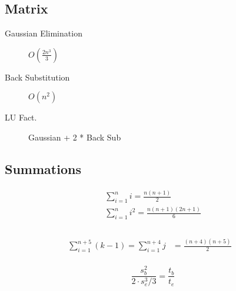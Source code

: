 \documentclass[10pt]{article}
\begin{document}
\begin{multicols}{3}
    \begin{minipage}{\columnwidth}
        \subsection*{Matrix}
        \begin{description}
            \item[Gaussian Elimination] \(O(\frac{2n^3}{3})\)
            \item[Back Substitution] \(O(n^2)\)
            \item[LU Fact.] Gaussian + 2 * Back Sub
        \end{description}
    \end{minipage}

    \begin{minipage}{\columnwidth}
        \subsection*{Summations}
        \begin{multicols}{2}
            \vspace*{-2em}
            \begin{equation*}
                \begin{aligned}
                    & \sum_{i=1}^{n} i = \frac{n(n+1)}{2} & \\
                    & \sum_{i=1}^{n} i^2 = \frac{n(n+1)(2n+1)}{6} & \\
                \end{aligned}
            \end{equation*}
            \columnbreak \\
            \vspace*{-2em}
            \begin{equation*}
                \begin{aligned}
                    \sum_{i=1}^{n+5}{(k-1)} = \sum_{i=1}^{n+4} j & = \frac{(n+4)(n+5)}{2} & \\
                \end{aligned}
            \end{equation*}
        \end{multicols}
    \end{minipage}

    \begin{minipage}{\columnwidth}
        \begin{equation*}
            \frac{s_b^2}{2\cdot s_e^3 / 3} = \frac{t_b}{t_e}
        \end{equation*}
    \end{minipage}
\end{multicols}
\end{document}
